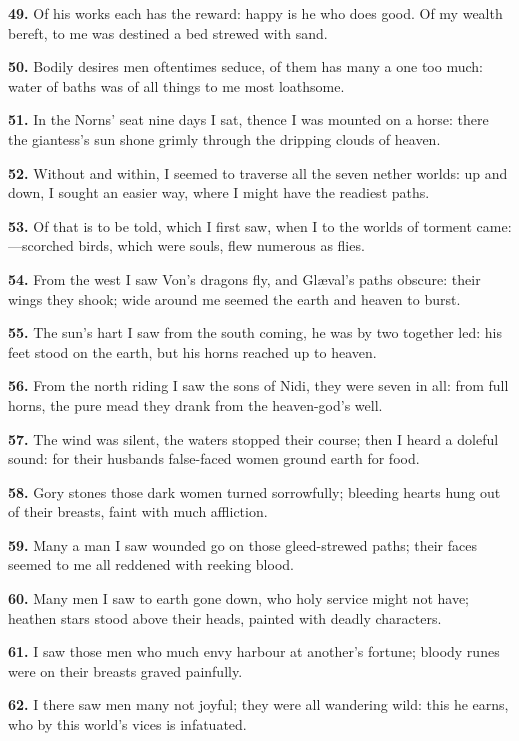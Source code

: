 \textbf{49.} Of his works each has the reward: happy is he who does good. Of
my wealth bereft, to me was destined a bed strewed with sand.

\textbf{50.} Bodily desires men oftentimes seduce, of them has many a one too
much: water of baths was of all things to me most loathsome.

\textbf{51.} In the Norns' seat nine days I sat, thence I was mounted on a
horse: there the giantess's sun shone grimly through the dripping
clouds of heaven.

\textbf{52.} Without and within, I seemed to traverse all the seven nether
worlds: up and down, I sought an easier way, where I might have the
readiest paths.

\textbf{53.} Of that is to be told, which I first saw, when I to the worlds
of torment came:—scorched birds, which were souls, flew numerous as
flies.

\textbf{54.} From the west I saw Von's dragons fly, and Glæval's paths
obscure: their wings they shook; wide around me seemed the earth and
heaven to burst.

\textbf{55.} The sun's hart I saw from the south coming, he was by two
together led: his feet stood on the earth, but his horns reached up to
heaven.

\textbf{56.} From the north riding I saw the sons of Nidi, they were seven in
all: from full horns, the pure mead they drank from the heaven-god's
well.

\textbf{57.} The wind was silent, the waters stopped their course; then I
heard a doleful sound: for their husbands false-faced women ground
earth for food.

\textbf{58.} Gory stones those dark women turned sorrowfully; bleeding hearts
hung out of their breasts, faint with much affliction.

\textbf{59.} Many a man I saw wounded go on those gleed-strewed paths; their
faces seemed to me all reddened with reeking blood.

\textbf{60.} Many men I saw to earth gone down, who holy service might not
have; heathen stars stood above their heads, painted with deadly
characters.

\textbf{61.} I saw those men who much envy harbour at another's fortune;
bloody runes were on their breasts graved painfully.

\textbf{62.} I there saw men many not joyful; they were all wandering wild:
this he earns, who by this world's vices is infatuated.


